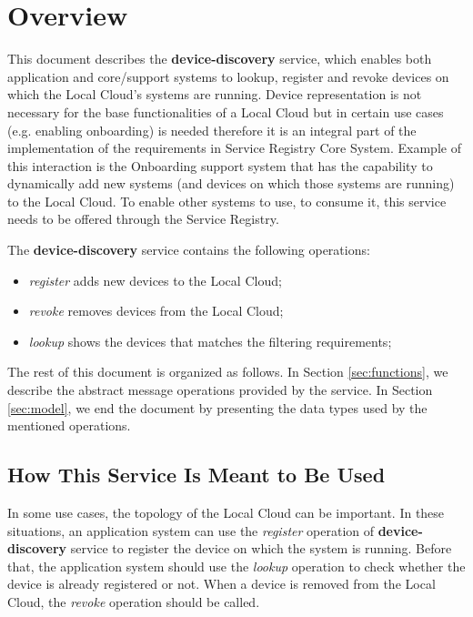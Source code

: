 \documentclass[a4paper]{arrowhead}
\begin{document}
\section{Overview}
\label{sec:overview}
This document describes the \textbf{device-discovery} service, which enables both application and core/support systems to lookup, register and revoke devices on which the Local Cloud's systems are running. Device representation is not necessary for the base functionalities of a Local Cloud but in certain use cases (e.g. enabling onboarding) is needed therefore it is an integral part of the implementation of the requirements in Service Registry Core System. Example of this interaction is the Onboarding support system that has the capability to dynamically add new systems (and devices on which those systems are running) to the Local Cloud. To enable other systems to use, to consume it, this service needs to be offered through the Service Registry.

The \textbf{device-discovery} service contains the following operations:

\begin{itemize}
    \item \textit{register} adds new devices to the Local Cloud;
    \item \textit{revoke} removes devices from the Local Cloud;
    \item \textit{lookup} shows the devices that matches the filtering requirements;
\end{itemize}

The rest of this document is organized as follows.
In Section \ref{sec:functions}, we describe the abstract message operations provided by the service.
In Section \ref{sec:model}, we end the document by presenting the data types used by the mentioned operations.

\subsection{How This Service Is Meant to Be Used}
In some use cases, the topology of the Local Cloud can be important. In these situations, an application system can use the \textit{register} operation of \textbf{device-discovery} service to register the device on which the system is running. Before that, the application system should use the \textit{lookup} operation to check whether the device is already registered or not. When a device is removed from the Local Cloud, the \textit{revoke} operation should be called.
\end{document}
